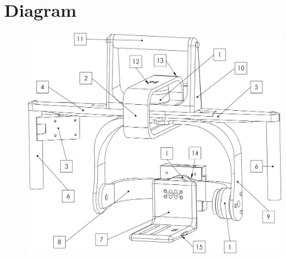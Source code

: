 \chapter{Diagram}

\begin{figure}[!h]
\centering
\includegraphics[width=13cm]{OpenSAM_Numbering.png}
\end{figure}


